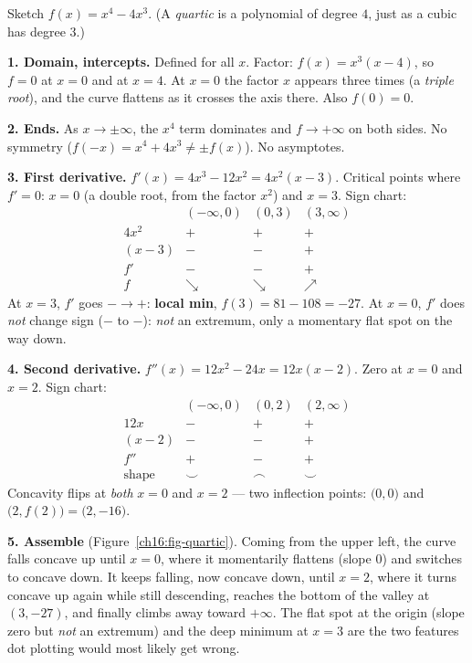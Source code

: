 \begin{example}\label{ch16:ex-sketch-quartic}
Sketch $f(x)=x^4-4x^3$. (A \emph{quartic} is a polynomial of degree $4$, just as
a cubic has degree $3$.)

\smallskip
\textbf{1. Domain, intercepts.} Defined for all $x$. Factor:
$f(x)=x^3(x-4)$, so $f=0$ at $x=0$ and at $x=4$. At $x=0$ the factor $x$
appears three times (a \emph{triple root}), and the curve flattens as it crosses
the axis there. Also $f(0)=0$.

\textbf{2. Ends.} As $x\to\pm\infty$, the $x^4$ term dominates and $f\to+\infty$ on
both sides. No symmetry ($f(-x)=x^4+4x^3\neq\pm f(x)$). No asymptotes.

\textbf{3. First derivative.} $f'(x)=4x^3-12x^2=4x^2(x-3)$. Critical points where
$f'=0$: $x=0$ (a double root, from the factor $x^2$) and $x=3$. Sign chart:
\[
\begin{array}{c|ccc}
& (-\infty,0) & (0,3) & (3,\infty)\\\hline
4x^2 & + & + & +\\
(x-3) & - & - & +\\
f' & - & - & +\\
f & \searrow & \searrow & \nearrow
\end{array}
\]
At $x=3$, $f'$ goes $-\to+$: \textbf{local min}, $f(3)=81-108=-27$. At $x=0$, $f'$
does \emph{not} change sign ($-$ to $-$): \emph{not} an extremum, only a momentary
flat spot on the way down.

\textbf{4. Second derivative.} $f''(x)=12x^2-24x=12x(x-2)$. Zero at $x=0$ and
$x=2$. Sign chart:
\[
\begin{array}{c|ccc}
& (-\infty,0) & (0,2) & (2,\infty)\\\hline
12x & - & + & +\\
(x-2) & - & - & +\\
f'' & + & - & +\\
\text{shape} & \smile & \frown & \smile
\end{array}
\]
Concavity flips at \emph{both} $x=0$ and $x=2$ --- two inflection points:
$\big(0,0\big)$ and $\big(2,f(2)\big)=\big(2,-16\big)$.

\textbf{5. Assemble} (Figure~\ref{ch16:fig-quartic}). Coming from the upper left,
the curve falls concave up until
$x=0$, where it momentarily flattens (slope $0$) and switches to concave down.
It keeps falling, now concave down, until $x=2$, where it turns
concave up again while still descending, reaches the bottom of the valley at
$(3,-27)$, and finally climbs away toward $+\infty$. The flat spot at the origin (slope zero
but \emph{not} an extremum) and the deep minimum at $x=3$ are the two features dot
plotting would most likely get wrong.
\end{example}

